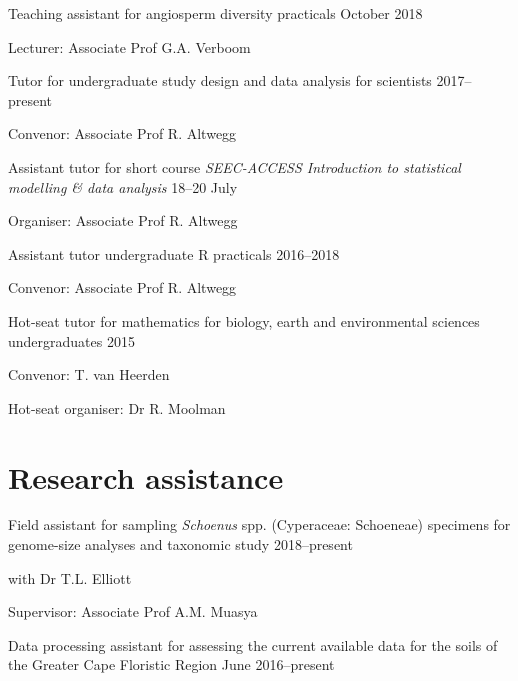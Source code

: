 \documentclass[]{article}
\begin{document}
Teaching assistant for angiosperm diversity practicals \hfill October
2018

\par

Lecturer: Associate Prof G.A. Verboom

Tutor for undergraduate study design and data analysis for scientists
\hfill 2017--present

\par

Convenor: Associate Prof R. Altwegg

Assistant tutor for short course \emph{SEEC-ACCESS Introduction to
statistical modelling \& data analysis} \hfill 18--20 July

\par

Organiser: Associate Prof R. Altwegg

Assistant tutor undergraduate R practicals \hfill 2016--2018

\par

Convenor: Associate Prof R. Altwegg

Hot-seat tutor for mathematics for biology, earth and environmental
sciences undergraduates \hfill 2015

\par

Convenor: T. van Heerden

\par

Hot-seat organiser: Dr R. Moolman

\hypertarget{research-assistance}{%
\section{Research assistance}\label{research-assistance}}

Field assistant for sampling \emph{Schoenus} spp. (Cyperaceae:
Schoeneae) specimens for genome-size analyses and taxonomic study
\hfill 2018--present

\par

with Dr T.L. Elliott

\par

Supervisor: Associate Prof A.M. Muasya

Data processing assistant for assessing the current available data for
the soils of the Greater Cape Floristic Region \hfill June 2016--present
\end{document}

